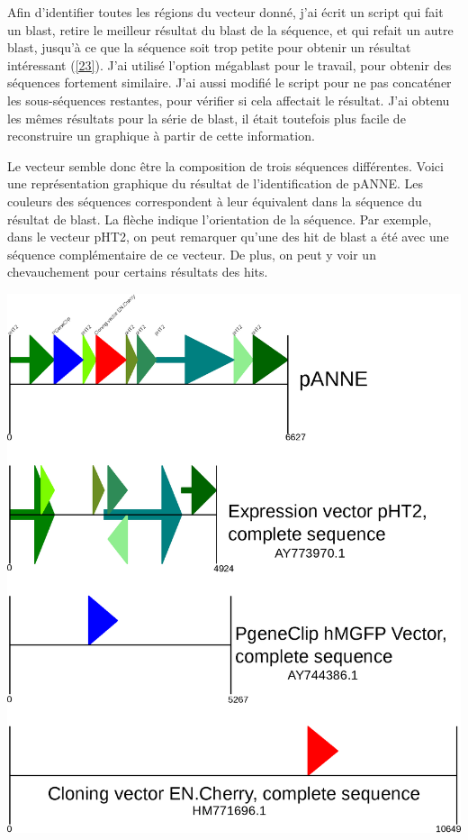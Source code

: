 \documentclass[10.8pt]{article} %
\begin{document}
Afin d'identifier toutes les régions du vecteur donné, j'ai écrit un script qui fait un blast, retire le
meilleur résultat du blast de la séquence, et qui refait un autre blast, jusqu'à ce que la séquence soit trop
petite pour obtenir un résultat intéressant (\ref{23}). J'ai utilisé l'option mégablast pour le travail, pour 
obtenir des séquences fortement similaire. J'ai aussi modifié le script pour ne pas concaténer les sous-séquences
restantes, pour vérifier si cela affectait le résultat. J'ai obtenu les mêmes résultats pour la série de blast,
il était toutefois plus facile de reconstruire un graphique à partir de cette information.

Le vecteur semble donc être la composition de trois séquences différentes. Voici une représentation graphique du
résultat de l'identification de pANNE. Les couleurs des séquences correspondent à leur équivalent dans la séquence
du résultat de blast. La flèche indique l'orientation de la séquence. Par exemple, dans le vecteur pHT2, on peut
remarquer qu'une des hit de blast a été avec une séquence complémentaire de ce vecteur. De plus, on peut y 
voir un chevauchement pour certains résultats des hits.

\includegraphics[width=\linewidth]{pANNE.eps}
\end{document}
